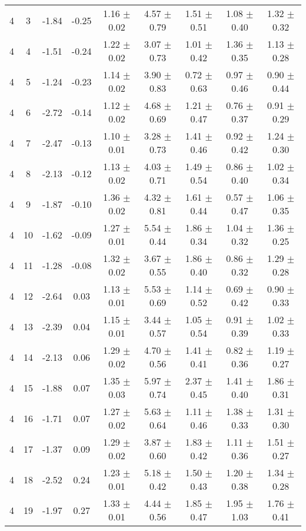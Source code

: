 \begin{landscape}
\begin{longtable}{ccccccccc}
   4 &  3 & -1.84 & -0.25 & 1.16 $\pm$ 0.02 & 4.57 $\pm$ 0.79 & 1.51 $\pm$ 0.51 & 1.08 $\pm$ 0.40 & 1.32 $\pm$ 0.32\\
   4 &  4 & -1.51 & -0.24 & 1.22 $\pm$ 0.02 & 3.07 $\pm$ 0.73 & 1.01 $\pm$ 0.42 & 1.36 $\pm$ 0.35 & 1.13 $\pm$ 0.28\\
   4 &  5 & -1.24 & -0.23 & 1.14 $\pm$ 0.02 & 3.90 $\pm$ 0.83 & 0.72 $\pm$ 0.63 & 0.97 $\pm$ 0.46 & 0.90 $\pm$ 0.44\\
   4 &  6 & -2.72 & -0.14 & 1.12 $\pm$ 0.02 & 4.68 $\pm$ 0.69 & 1.21 $\pm$ 0.47 & 0.76 $\pm$ 0.37 & 0.91 $\pm$ 0.29\\
   4 &  7 & -2.47 & -0.13 & 1.10 $\pm$ 0.01 & 3.28 $\pm$ 0.73 & 1.41 $\pm$ 0.46 & 0.92 $\pm$ 0.42 & 1.24 $\pm$ 0.30\\
   4 &  8 & -2.13 & -0.12 & 1.13 $\pm$ 0.02 & 4.03 $\pm$ 0.71 & 1.49 $\pm$ 0.54 & 0.86 $\pm$ 0.40 & 1.02 $\pm$ 0.34\\
   4 &  9 & -1.87 & -0.10 & 1.36 $\pm$ 0.02 & 4.32 $\pm$ 0.81 & 1.61 $\pm$ 0.44 & 0.57 $\pm$ 0.47 & 1.06 $\pm$ 0.35\\
   4 & 10 & -1.62 & -0.09 & 1.27 $\pm$ 0.01 & 5.54 $\pm$ 0.44 & 1.86 $\pm$ 0.34 & 1.04 $\pm$ 0.32 & 1.36 $\pm$ 0.25\\
   4 & 11 & -1.28 & -0.08 & 1.32 $\pm$ 0.02 & 3.67 $\pm$ 0.55 & 1.86 $\pm$ 0.40 & 0.86 $\pm$ 0.32 & 1.29 $\pm$ 0.28\\
   4 & 12 & -2.64 & 0.03 & 1.13 $\pm$ 0.01 & 5.53 $\pm$ 0.69 & 1.14 $\pm$ 0.52 & 0.69 $\pm$ 0.42 & 0.90 $\pm$ 0.33\\
   4 & 13 & -2.39 & 0.04 & 1.15 $\pm$ 0.01 & 3.44 $\pm$ 0.57 & 1.05 $\pm$ 0.54 & 0.91 $\pm$ 0.39 & 1.02 $\pm$ 0.33\\
   4 & 14 & -2.13 & 0.06 & 1.29 $\pm$ 0.02 & 4.70 $\pm$ 0.56 & 1.41 $\pm$ 0.41 & 0.82 $\pm$ 0.36 & 1.19 $\pm$ 0.27\\
   4 & 15 & -1.88 & 0.07 & 1.35 $\pm$ 0.03 & 5.97 $\pm$ 0.74 & 2.37 $\pm$ 0.45 & 1.41 $\pm$ 0.40 & 1.86 $\pm$ 0.31\\
   4 & 16 & -1.71 & 0.07 & 1.27 $\pm$ 0.02 & 5.63 $\pm$ 0.64 & 1.11 $\pm$ 0.46 & 1.38 $\pm$ 0.33 & 1.31 $\pm$ 0.30\\
   4 & 17 & -1.37 & 0.09 & 1.29 $\pm$ 0.02 & 3.87 $\pm$ 0.60 & 1.83 $\pm$ 0.42 & 1.11 $\pm$ 0.36 & 1.51 $\pm$ 0.27\\
   4 & 18 & -2.52 & 0.24 & 1.23 $\pm$ 0.01 & 5.18 $\pm$ 0.42 & 1.50 $\pm$ 0.43 & 1.20 $\pm$ 0.38 & 1.34 $\pm$ 0.28\\
   4 & 19 & -1.97 & 0.27 & 1.33 $\pm$ 0.01 & 4.44 $\pm$ 0.56 & 1.85 $\pm$ 0.47 & 1.95 $\pm$ 1.03 & 1.76 $\pm$ 0.41\\

\end{longtable}
\end{landscape}
